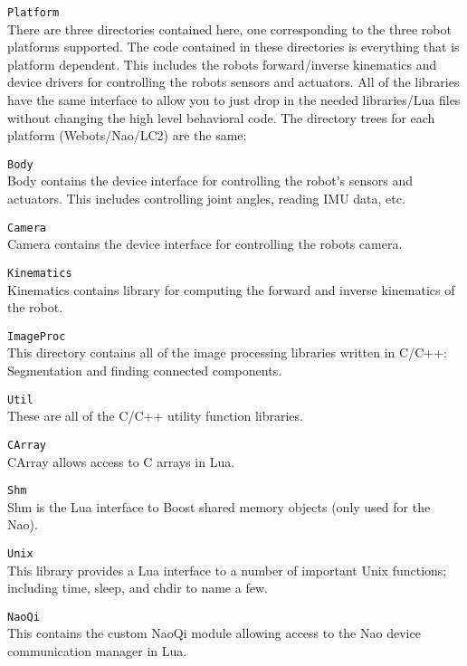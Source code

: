 \documentclass{article}
\begin{document}
    \begin{description}

      \item \texttt{Platform} \\ 
        There are three directories contained here, one corresponding to the three robot platforms supported. The code contained in these directories is everything that is platform dependent. This includes the robots forward/inverse kinematics and device drivers for controlling the robots sensors and actuators. All of the libraries have the same interface to allow you to just drop in the needed libraries/Lua files without changing the high level behavioral code. The directory trees for each platform (Webots/Nao/LC2) are the same:

      \begin{description}
        \item \texttt{Body} \\
          Body contains the device interface for controlling the robot's sensors and actuators. This includes controlling joint angles, reading IMU data, etc. 
        \item \texttt{Camera} \\
          Camera contains the device interface for controlling the robots camera.
        \item \texttt{Kinematics} \\ 
          Kinematics contains library for computing the forward and inverse kinematics of the robot.
      \end{description}
      \item \texttt{ImageProc} \\
        This directory contains all of the image processing libraries written in C/C++: Segmentation and finding connected components.
      \item \texttt{Util} \\
        These are all of the C/C++ utility function libraries. 
      \begin{description}
        \item \texttt{CArray} \\
          CArray allows access to C arrays in Lua.
        \item \texttt{Shm} \\
          Shm is the Lua interface to Boost shared memory objects (only used for the Nao).
        \item \texttt{Unix} \\
          This library provides a Lua interface to a number of important Unix functions; including time, sleep, and chdir to name a few. 
        \item \texttt{NaoQi} \\
          This contains the custom NaoQi module allowing access to the Nao device communication manager in Lua.
      \end{description}
    \end{description}
\end{document}
